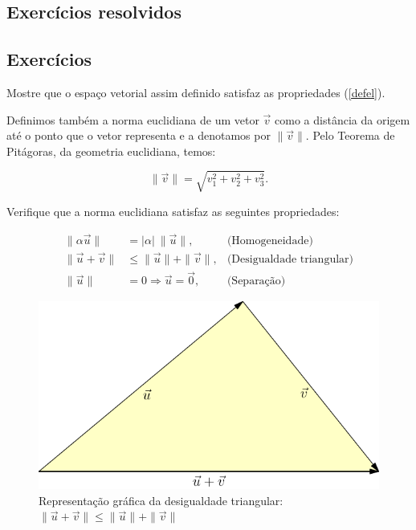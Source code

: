 \subsection*{Exercícios resolvidos}

\construirExeresol

\subsection*{Exercícios}

\begin{exer} Mostre que o espaço vetorial assim definido satisfaz as propriedades (\ref{defel}).
\end{exer}

Definimos também a norma euclidiana de um vetor $\vec{v}$ como a distância da origem até o ponto que o vetor representa e a denotamos por $\|\vec{v}\|$. Pelo Teorema de Pitágoras, da geometria euclidiana, temos:


\begin{equation}\label{defnorma}\|\vec{v}\|=\sqrt{v_1^2+v_2^2+v_3^2}.\end{equation}
\begin{exer}\label{exnorma}Verifique que a norma euclidiana satisfaz as seguintes propriedades:
  
\begin{subequations}\label{propnorma}
\begin{align}
\|\alpha \vec{u}\|&=|\alpha|~\!\|\vec{u}\|,&\text{(Homogeneidade)}\label{propnormahom}\\
\|\vec{u}+\vec{v}\|&\leq \|\vec{u}\|+\|\vec{v}\|,&\text{(Desigualdade triangular)}\label{propnormatri}\\
\|\vec{u}\|&=0 \Longrightarrow \vec{u}=\vec{0},&\text{(Separação)}\label{propnormasep}
\end{align}
\end{subequations}
\end{exer}

\begin{figure}%
\begin{center}
 \includegraphics{./cap_algvet/figs/desigualdade_triangulo}
      \caption{Representação gráfica da desigualdade triangular: $\|\vec{u}+\vec{v}\|\leq \|\vec{u}\|+\|\vec{v}\|$}
      \label{fig:des_triang}
      \end{center}
   \end{figure}

